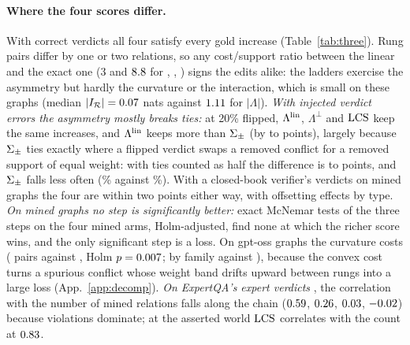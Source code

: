 \paragraph{Where the four scores differ.} With correct verdicts all four satisfy every gold
increase (Table~\ref{tab:three}). Rung pairs differ by one or two relations, so any cost/support ratio between the linear and the
exact one (3 and $8.8$ for \ent, \con, \cnc) signs the edits alike: the ladders exercise the
asymmetry but hardly the curvature or the interaction, which is small on these graphs (median
$|I_{\mathcal{R}}|=0.07$ nats against $1.11$ for $|\Lambda|$). \emph{With injected verdict errors the asymmetry mostly breaks ties:} at 20\% flipped, $\Lambda^{\mathrm{lin}}$,
$\Lambda^{\perp}$ and $\mathrm{LCS}$ keep the same increases, and $\Lambda^{\mathrm{lin}}$ keeps more than $\Sigma_{\pm}$ (by
\vnDiffLWLoIncTwenty{} to \vnDiffLWHiIncTwenty{} points), largely because $\Sigma_{\pm}$ ties exactly where a flipped verdict swaps a removed conflict for a removed
support of equal weight: with ties counted as half the difference is \vnDiffLWHalfLoIncTwenty{} to \vnDiffLWHalfHiIncTwenty{} points, and $\Sigma_{\pm}$ falls
less often (\vnWsumFallIncTwenty\% against \vnLinFallIncTwenty\%). With a closed-book verifier's verdicts
on mined graphs the four are within two points either way, with offsetting effects by type. \emph{On mined graphs no step is
significantly better:} exact McNemar tests of the three steps on the four mined arms, Holm-adjusted,
find none at which the richer score wins, and the only significant step is a loss. On gpt-oss graphs the
curvature costs (\mcCurvOssB{} pairs against \mcCurvOssC, Holm $p=0.007$; by family
\mcCurvOssFamB{} against \mcCurvOssFamC), because the convex cost turns a spurious conflict whose weight
band drifts upward between rungs into a large loss (App.~\ref{app:decomp}). \emph{On ExpertQA's expert
verdicts} \citep{expertqa}, the correlation with the number of mined relations falls along the chain
($0.59$, $0.26$, $0.03$, $-0.02$) because violations
dominate; at the asserted world $\mathrm{LCS}$ correlates with the count at $0.83$.

